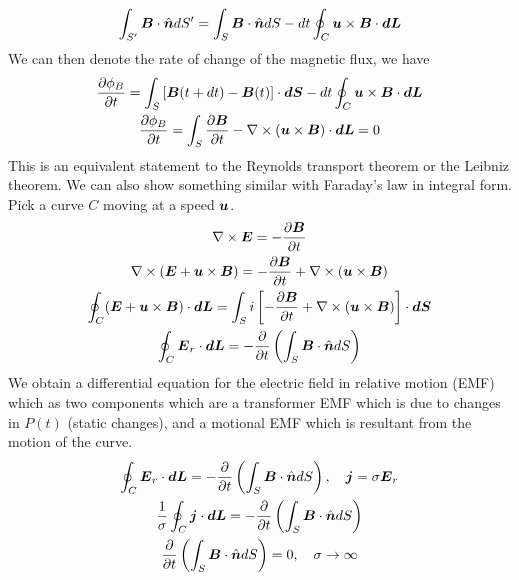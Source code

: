 \documentclass{article}
\begin{document}
\begin{gather*}
    \int_{S'} \boldsymbol{B}\cdot\hat{\boldsymbol{n}} dS' = \int_{S}\boldsymbol{B}\cdot\hat{\boldsymbol{n}} dS - dt\oint_{C}
    \boldsymbol{u}\times\boldsymbol{B} \cdot \boldsymbol{dL}
\end{gather*}
We can then denote the rate of change of the magnetic flux, we have
\begin{gather*}
    \frac{\partial \phi_B}{\partial t} = \int_S \left[\boldsymbol{B}(t+dt)-\boldsymbol{B}(t)\right]\cdot\boldsymbol{dS}-
    dt\oint_{C}\boldsymbol{u}\times\boldsymbol{B}\cdot\boldsymbol{dL}\\
    \frac{\partial \phi_B}{\partial t} = \int_S \frac{\partial \boldsymbol{B}}{\partial t} - \nabla\times(\boldsymbol{u}\times\boldsymbol{B})\cdot\boldsymbol{dL} = 0\\
\end{gather*}
This is an equivalent statement to the Reynolds transport theorem or the Leibniz
theorem. We can also show something similar with Faraday's law in integral form. 
Pick a curve $C$ moving at a speed $\boldsymbol{u}$. 
\begin{gather*}
    \nabla\times\boldsymbol{E} = -\frac{\partial \boldsymbol{B}}{\partial t}\\
    \nabla\times(\boldsymbol{E} + \boldsymbol{u}\times\boldsymbol{B}) = -\frac{\partial \boldsymbol{B}}{\partial t} + \nabla\times(\boldsymbol{u}\times\boldsymbol{B})\\
    \oint_C (\boldsymbol{E} + \boldsymbol{u}\times\boldsymbol{B})\cdot\boldsymbol{dL} = \int_Si\left[-\frac{\partial \boldsymbol{B}}{\partial t} +
    \nabla\times(\boldsymbol{u}\times\boldsymbol{B})\right] \cdot\boldsymbol{dS}\\
    \oint_C \boldsymbol{E}_r\cdot\boldsymbol{dL} = -\frac{\partial }{\partial t}\left(\int_S\boldsymbol{B}\cdot\hat{\boldsymbol{n}} dS \right)
\end{gather*}
We obtain a differential equation for the electric field in relative motion
(EMF) which as two components which are a transformer EMF which is due to
changes in $P(t)$ (static changes), and a motional EMF which is resultant from the motion of the
curve. 
\begin{gather*}
    \oint_C \boldsymbol{E}_r\cdot\boldsymbol{dL} = -\frac{\partial }{\partial t}\left(\int_S \boldsymbol{B}\cdot\hat{\boldsymbol{n}} dS\right), \quad
    \boldsymbol{j} = \sigma \boldsymbol{E}_r\\
    \frac{1}{\sigma}\oint_C\boldsymbol{j}\cdot\boldsymbol{dL} = -\frac{\partial }{\partial t}\left(\int_S\boldsymbol{B}\cdot\hat{\boldsymbol{n}}
    dS\right)\\
    \frac{\partial }{\partial t}\left(\int_S\boldsymbol{B}\cdot\hat{\boldsymbol{n}} dS\right) = 0, \quad \sigma \to \infty
\end{gather*}


\section{}
\end{document}
